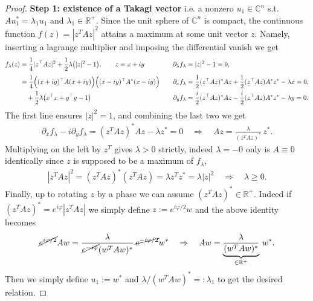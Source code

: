 \documentclass[../QFT_main.tex]{subfiles}
\begin{document}
\begin{proof}
\noindent
\textbf{Step 1: existence of a Takagi vector} i.e. a nonzero $u_1\in\mathbb{C}^n$ s.t. $Au_1^* =\lambda_1 u_1$ and $\lambda_1 \in\mathbb{R}^+$.
Since the unit sphere of $\mathbb{C}^n$ is compact, the continuous function $f(z) = |z^T A z|^2$ attains a maximum at some unit vector $z$.
Namely, inserting a lagrange multiplier and imposing the differential vanish we get
{\small\begin{align}
\begin{alignedat}{2}
f_\lambda(z)
&= \frac14\lvert z^\top A z\rvert^2 + \frac12\lambda\bigl(\lvert z\rvert^2-1\bigr),
\qquad z=x+iy
\qquad&
\partial_\lambda f_\lambda &= \lvert z\rvert^2-1=0,\\[1mm]
&= \frac14\Bigl((x+iy)^\top A(x+iy)\Bigr)\Bigl((x-iy)^\top A^*(x-iy)\Bigr)
\qquad&
\partial_x f_\lambda &= \frac12 (z^\top A z)^*Az + \frac12 (z^\top A z)A^*z^* - \lambda x=0,\\
&\quad + \frac12\lambda\bigl(x^\top x+y^\top y-1\bigr)
\qquad&
\partial_y f_\lambda &= \frac{i}{2}(z^\top A z)^*Az - \frac{i}{2}(z^\top A z)A^*z^* - \lambda y=0.
\end{alignedat}
\end{align}}
%
The first line ensures $|z|^2=1$, and combining the last two we get
\begin{align}
    \partial_x f_\lambda -i \partial_yf_\lambda = (z^T A z)^* Az-\lambda z^*=0 \quad \Rightarrow\quad Az = \frac{\lambda}{(z^T A z)^*}\, z^*.
\end{align}
Multiplying on the left by $z^T$ gives $\lambda>0$ strictly, indeed $\lambda=-0$ only is $A\equiv 0$ identically since $z$ is supposed to be a maximum of $f_\lambda$,
\begin{align}
    |z^TAz|^2=(z^T A z)^* (z^TAz) = \lambda z^Tz^*= \lambda |z|^2 \quad \Rightarrow\quad \lambda\geq0.
\end{align}
Finally, up to rotating $z$ by a phase we can assume $(z^T A z)^*\in\mathbb{R}^+$.
Indeed if $(z^T A z)^*= e^{i\varphi}|z^T A z|$ we simply define $z:= e^{i\varphi/2}w$ and the above identity becomes
\begin{align}
    \cancel{e^{i\varphi/2}}Aw = \frac{\lambda}{\cancel{e^{-i\varphi}}(w^T A w)^*}\, \cancel{e^{-i\varphi/2}}w^* \quad \Rightarrow\quad Aw= \underbrace{\frac{\lambda}{(w^T A w)^*}}_{\in\mathbb{R}^+}\, w^*.
\end{align}
Then we simply define $u_1 := w^*$ and $\lambda/(w^T A w)^* =: \lambda_1$ to get the desired relation.


\end{proof}
\end{document}
